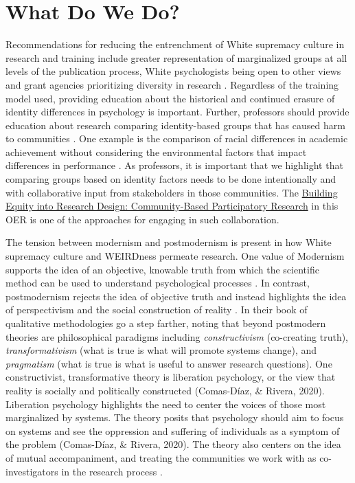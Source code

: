 \documentclass[
  11pt,
]{book}
\begin{document}
\section{What Do We Do?}\label{what-do-we-do}

Recommendations for reducing the entrenchment of White supremacy culture in research and training include greater representation of marginalized groups at all levels of the publication process, White psychologists being open to other views and grant agencies prioritizing diversity in research \citep{cokley_defense_2013, dupree_psychological_2022, henrich_most_2010}. Regardless of the training model used, providing education about the historical and continued erasure of identity differences in psychology is important. Further, professors should provide education about research comparing identity-based groups that has caused harm to communities \citep{cokley_defense_2013}. One example is the comparison of racial differences in academic achievement without considering the environmental factors that impact differences in performance \citep{cokley_defense_2013}. As professors, it is important that we highlight that comparing groups based on identity factors needs to be done intentionally and with collaborative input from stakeholders in those communities. The \hyperref[ComRes]{Building Equity into Research Design: Community-Based Participatory Research} in this OER is one of the approaches for engaging in such collaboration.

The tension between modernism and postmodernism \citep{cokley_defense_2013} is present in how White supremacy culture and WEIRDness permeate research. One value of Modernism supports the idea of an objective, knowable truth from which the scientific method can be used to understand psychological processes \citep{cokley_defense_2013}. In contrast, postmodernism rejects the idea of objective truth and instead highlights the idea of perspectivism and the social construction of reality \citep{cokley_defense_2013}. In their book of qualitative methodologies \citep{creswell_qualitative_2016} go a step farther, noting that beyond postmodern theories are philosophical paradigms including \emph{constructivism} (co-creating truth), \emph{transformativism} (what is true is what will promote systems change), and \emph{pragmatism} (what is true is what is useful to answer research questions). One constructivist, transformative theory is liberation psychology, or the view that reality is socially and politically constructed (Comas-Díaz, \& Rivera, 2020). Liberation psychology highlights the need to center the voices of those most marginalized by systems. The theory posits that psychology should aim to focus on systems and see the oppression and suffering of individuals as a symptom of the problem (Comas-Díaz, \& Rivera, 2020). The theory also centers on the idea of mutual accompaniment, and treating the communities we work with as co-investigators in the research process \citep{comas-diaz_liberation_2020}.
\end{document}
